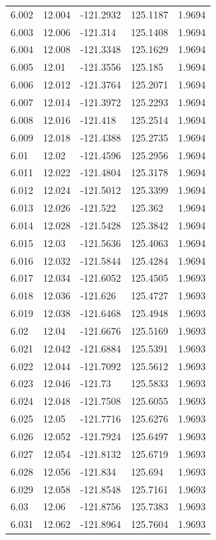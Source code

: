 \begin{tabular}{lllll}
6.002 & 12.004 & -121.2932 & 125.1187 & 1.9694 \\
6.003 & 12.006 & -121.314 & 125.1408 & 1.9694 \\
6.004 & 12.008 & -121.3348 & 125.1629 & 1.9694 \\
6.005 & 12.01 & -121.3556 & 125.185 & 1.9694 \\
6.006 & 12.012 & -121.3764 & 125.2071 & 1.9694 \\
6.007 & 12.014 & -121.3972 & 125.2293 & 1.9694 \\
6.008 & 12.016 & -121.418 & 125.2514 & 1.9694 \\
6.009 & 12.018 & -121.4388 & 125.2735 & 1.9694 \\
6.01 & 12.02 & -121.4596 & 125.2956 & 1.9694 \\
6.011 & 12.022 & -121.4804 & 125.3178 & 1.9694 \\
6.012 & 12.024 & -121.5012 & 125.3399 & 1.9694 \\
6.013 & 12.026 & -121.522 & 125.362 & 1.9694 \\
6.014 & 12.028 & -121.5428 & 125.3842 & 1.9694 \\
6.015 & 12.03 & -121.5636 & 125.4063 & 1.9694 \\
6.016 & 12.032 & -121.5844 & 125.4284 & 1.9694 \\
6.017 & 12.034 & -121.6052 & 125.4505 & 1.9693 \\
6.018 & 12.036 & -121.626 & 125.4727 & 1.9693 \\
6.019 & 12.038 & -121.6468 & 125.4948 & 1.9693 \\
6.02 & 12.04 & -121.6676 & 125.5169 & 1.9693 \\
6.021 & 12.042 & -121.6884 & 125.5391 & 1.9693 \\
6.022 & 12.044 & -121.7092 & 125.5612 & 1.9693 \\
6.023 & 12.046 & -121.73 & 125.5833 & 1.9693 \\
6.024 & 12.048 & -121.7508 & 125.6055 & 1.9693 \\
6.025 & 12.05 & -121.7716 & 125.6276 & 1.9693 \\
6.026 & 12.052 & -121.7924 & 125.6497 & 1.9693 \\
6.027 & 12.054 & -121.8132 & 125.6719 & 1.9693 \\
6.028 & 12.056 & -121.834 & 125.694 & 1.9693 \\
6.029 & 12.058 & -121.8548 & 125.7161 & 1.9693 \\
6.03 & 12.06 & -121.8756 & 125.7383 & 1.9693 \\
6.031 & 12.062 & -121.8964 & 125.7604 & 1.9693 \\

\end{tabular}
